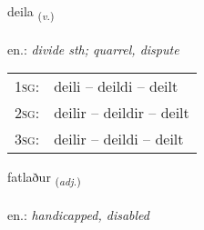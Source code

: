 \documentclass[frontgrid, backgrid]{flacards}\usepackage[]{graphicx}\usepackage[]{xcolor}
\begin{document}
\renewcommand{\blhead}{\vskip5pt {\small\bfseries\footnotesize Sagnorð | Verb }}
\renewcommand{\bcfoot}{\vskip5pt \hspace{2pt}{\small\bfseries\footnotesize 2K}}


{deila \small{\textsubscript{(\textit{v.})}} \\[1ex] %
\textphonetic{[teiːla]} \\
en.: \emph{divide sth; quarrel, dispute} \\  [2ex]
\renewcommand*{\arraystretch}{0.8}
\begin{tabular}{p{1cm}l}
\textsc{1sg}: & deili -- deildi -- deilt \\ 
\textsc{2sg}: & deilir -- deildir -- deilt \\ 
\textsc{3sg}: & deilir -- deildi -- deilt \\ 
\end{tabular}
}

\renewcommand{\flhead}{\vskip5pt \fboxsep=0pt {\small\bfseries\footnotesize Lýsingarorð | Adjective}}
\renewcommand{\fcfoot}{\vskip5pt \fboxsep=0pt \hspace{2pt}{\small\bfseries\footnotesize 2K}}

\renewcommand{\blhead}{\vskip5pt {\small\bfseries\footnotesize Lýsingarorð | Adjective }}
\renewcommand{\bcfoot}{\vskip5pt \hspace{2pt}{\small\bfseries\footnotesize 2K}}


{fatlaður \small{\textsubscript{(\textit{adj.})}} \\[1ex] %
\textphonetic{[fahtlaðʏr]} \\
en.: \emph{handicapped, disabled} \\  [2ex]
\renewcommand*{\arraystretch}{0.8}
}
\end{document}
